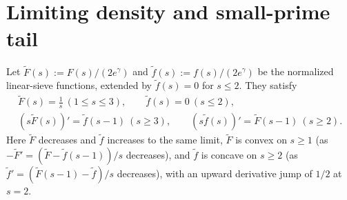 \documentclass[11pt,reqno]{amsart}
\theoremstyle{remark}
\newcommand{\normF}{\widetilde{F}}
\newcommand{\normf}{\widetilde{f}}
\numberwithin{equation}{section}
\begin{document}
\section{Limiting density and small-prime tail}\label{sec:density}

Let $\normF(s) := F(s)/(2e^\gamma)$ and $\normf(s) := f(s)/(2e^\gamma)$ be the normalized linear-sieve functions, extended by $\normf(s) = 0$ for $s \le 2$. They satisfy
\begin{equation}\label{eq:delay}
\begin{gathered}
\normF(s) = \frac{1}{s}\ (1\le s\le 3),\qquad \normf(s)=0\ (s\le 2),\\
(s\normF(s))' = \normf(s-1)\ (s\ge 3),\qquad (s\normf(s))' = \normF(s-1)\ (s\ge 2).
\end{gathered}
\end{equation}
Here $\normF$ decreases and $\normf$ increases to the same limit, $\normF$ is convex on $s \ge 1$ (as $-\normF' = (\normF - \normf(s-1))/s$ decreases), and $\normf$ is concave on $s \ge 2$ (as $\normf' = (\normF(s-1) - \normf)/s$ decreases), with an upward derivative jump of $1/2$ at $s=2$.
\end{document}
